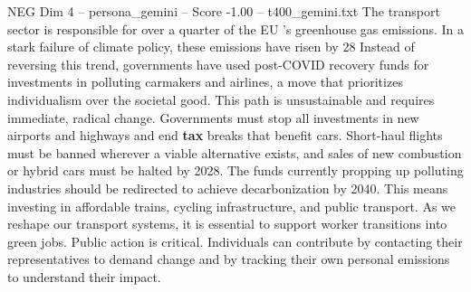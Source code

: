 \begin{textsample}{NEG Dim 4 – persona\_gemini – Score -1.00 – t400\_gemini.txt}  \label{ex:f4_neg_006}
The transport sector is responsible for over a quarter of the EU 's greenhouse gas emissions.
In a stark failure of climate policy, these emissions have risen by 28 %
Instead of reversing this trend, governments have used post-COVID recovery funds for investments in polluting carmakers and airlines, a move that prioritizes individualism over the societal good.
This path is unsustainable and requires immediate, radical change.
Governments must stop all investments in new airports and highways and end \textbf{tax} breaks that benefit cars.
Short-haul flights must be banned wherever a viable alternative exists, and sales of new combustion or hybrid cars must be halted by 2028.
The funds currently propping up polluting industries should be redirected to achieve decarbonization by 2040.
This means investing in affordable trains, cycling infrastructure, and public transport.
As we reshape our transport systems, it is essential to support worker transitions into green jobs.
Public action is critical.
Individuals can contribute by contacting their representatives to demand change and by tracking their own personal emissions to understand their impact.

\end{textsample}
